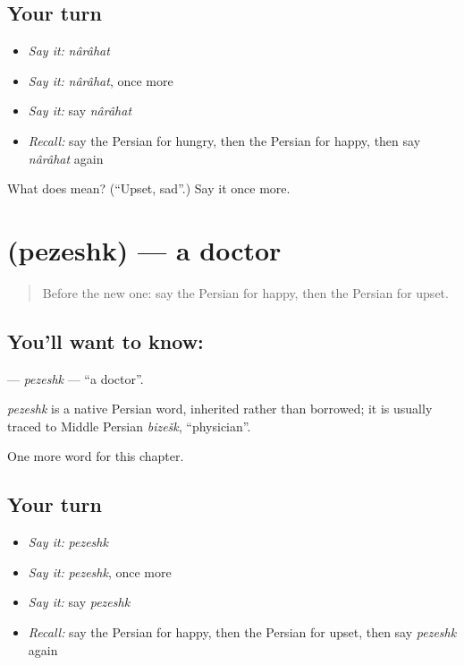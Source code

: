 \subsection*{Your turn}
\begin{itemize}
\raggedright
  \item \emph{Say it:} \emph{nârâhat}
  \item \emph{Say it:} \emph{nârâhat}, once more
  \item \emph{Say it:} say \emph{nârâhat}
  \item \emph{Recall:} say the Persian for hungry, then the Persian for happy, then say \emph{nârâhat} again
\end{itemize}

\begin{tcolorbox}[breakable,colback=teal!4,colframe=teal!35!black,title={Before you move on}]
What does  mean? (\textquotedblleft{}Upset, sad\textquotedblright{}.) Say it once more.
\end{tcolorbox}
\section[\texorpdfstring{\fa{پزشک} (pezeshk)}{پزشک (pezeshk)}]{ (pezeshk) — a doctor}

\label{lesson:FA-C32-pezeshk}



\begin{quote}
Before the new one: say the Persian for happy, then the Persian for upset.
\end{quote}

\subsection*{You'll want to know: }
\textbf{} — \emph{pezeshk} — \textquotedblleft{}a doctor\textquotedblright{}.

\begin{cousinweb}
\emph{pezeshk} is a native Persian word, inherited rather than borrowed; it is usually traced to Middle Persian \emph{bizešk}, \textquotedblleft{}physician\textquotedblright{}.
\end{cousinweb}

\begin{grammarlens}[title={What you've built}]
One more word for this chapter.
\end{grammarlens}

\subsection*{Your turn}
\begin{itemize}
\raggedright
  \item \emph{Say it:} \emph{pezeshk}
  \item \emph{Say it:} \emph{pezeshk}, once more
  \item \emph{Say it:} say \emph{pezeshk}
  \item \emph{Recall:} say the Persian for happy, then the Persian for upset, then say \emph{pezeshk} again
\end{itemize}

